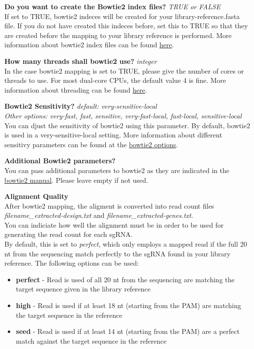 \documentclass[]{article}
\providecommand{\tightlist}{%
  \setlength{\itemsep}{0pt}\setlength{\parskip}{0pt}}
\begin{document}
\textbf{Do you want to create the Bowtie2 index files?} \emph{TRUE or
FALSE}\\
If set to TRUE, bowtie2 indeces will be created for your
library-reference.fasta file. If you do not have created this indeces
before, set this to TRUE so that they are created before the mapping to
your library reference is performed. More information about bowtie2
index files can be found
\href{http://bowtie-bio.sourceforge.net/bowtie2/manual.shtml\#the-bowtie2-build-indexer}{here}.

\textbf{How many threads shall bowtie2 use?} \emph{integer}\\
In the case bowtie2 mapping is set to TRUE, please give the number of
cores or threads to use. For most dual-core CPUs, the default value 4 is
fine. More information about threading can be found
\href{http://bowtie-bio.sourceforge.net/bowtie2/manual.shtml\#performance-tuning}{here}.

\textbf{Bowtie2 Sensitivity?} \emph{default: very-sensitive-local}\\
\emph{Other options: very-fast, fast, sensitive, very-fast-local,
fast-local, sensitive-local}\\
You can djust the sensitivity of bowtie2 using this parameter. By
default, bowtie2 is used in a very-sensitive-local setting. More
information about different sensitivy parameters can be found at the
\href{http://bowtie-bio.sourceforge.net/bowtie2/manual.shtml\#options}{bowtie2
options}.

\textbf{Additional Bowtie2 parameters?}\\
You can pass additional parameters to bowtie2 as they are indicated in
the
\href{http://bowtie-bio.sourceforge.net/bowtie2/manual.shtml}{bowtie2
manual}. Please leave empty if not used.

\textbf{Alignment Quality}\\
After bowtie2 mapping, the aligment is converted into read count files
\emph{filename\_extracted-design.txt} and
\emph{filename\_extracted-genes.txt}.\\
You can indiciate how well the alignment must be in order to be used for
generating the read count for each sgRNA.\\
By default, this is set to \emph{perfect}, which only employs a mapped
read if the full 20 nt from the sequencing match perfectly to the sgRNA
found in your library reference. The following options can be used:

\begin{itemize}
\tightlist
\item
  \textbf{perfect} - Read is used of all 20 nt from the sequencing are
  matching the target sequence given in the library reference
\item
  \textbf{high} - Read is used if at least 18 nt (starting from the PAM)
  are matching the target sequence in the reference
\item
  \textbf{seed} - Read is used if at least 14 nt (starting from the PAM)
  are a perfect match against the target sequence in the reference
\end{itemize}
\end{document}

